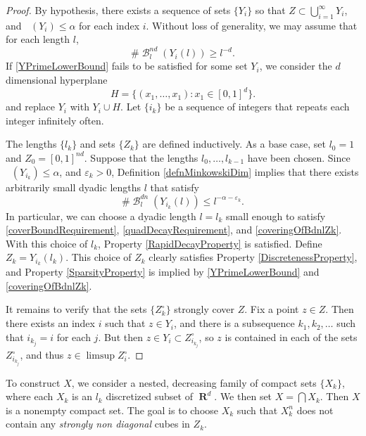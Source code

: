 \documentclass[dvipsnames,letterpaper,12pt]{article}
\numberwithin{equation}{section}
\theoremstyle{plain}
\theoremstyle{remark}
\DeclareMathOperator{\lowminkdim}{\underline{\dim}_{\mathbf{M}}}
\DeclareMathOperator{\RR}{\mathbf{R}}
\DeclareMathOperator{\setcolon}{\colon}
\DeclareMathOperator{\B}{\mathcal{B}}
\begin{document}
\begin{proof}
	By hypothesis, there exists a sequence of sets $\{Y_i\}$ so that $Z \subset \bigcup_{i = 1}^\infty Y_i$, and $\lowminkdim(Y_i) \leq \alpha$ for each index $i$. Without loss of generality, we may assume that for each length $l$,
	\begin{equation}\label{YPrimeLowerBound}
		\# \B^{nd}_l(Y_i(l)) \geq l^{-d}.
	\end{equation}
	If \eqref{YPrimeLowerBound} fails to be satisfied for some set $Y_i$, we consider the $d$ dimensional hyperplane
	\[ H = \{ (x_1,\dots, x_1) \setcolon x_1 \in [0,1]^d \}. \]
	and replace $Y_i$ with $Y_i \cup H$. Let $\{ i_k \}$ be a sequence of integers that repeats each integer infinitely often.

	The lengths $\{ l_k \}$ and sets $\{ Z_k \}$ are defined inductively. As a base case, set $l_0 = 1$ and $Z_0 = [0,1]^{nd}$. Suppose that the lengths $l_0, \ldots, l_{k-1}$ have been chosen. Since $\lowminkdim(Y_{i_k}) \leq \alpha$, and $\varepsilon_k > 0$, Definition \ref{defnMinkowskiDim} implies that there exists arbitrarily small dyadic lengths $l$ that satisfy
	\begin{equation} \label{coveringOfBdnlZk}
		\# \B^{dn}_l(Y_{i_k}(l)) \leq l^{-\alpha - \varepsilon_k}.
	\end{equation}
	In particular, we can choose a dyadic length $l = l_k$ small enough to satisfy \eqref{coverBoundRequirement}, \eqref{quadDecayRequirement}, and \eqref{coveringOfBdnlZk}. With this choice of $l_k$, Property \ref{RapidDecayProperty} is satisfied. Define $Z_k = Y_{i_k}(l_k)$. This choice of $Z_k$ clearly satisfies Property \ref{DiscretenessProperty}, and Property \ref{SparsityProperty} is implied by \eqref{YPrimeLowerBound} and \eqref{coveringOfBdnlZk}.

	It remains to verify that the sets $\{ Z_k^\circ \}$ strongly cover $Z$. Fix a point $z \in Z$. Then there exists an index $i$ such that $z \in Y_i$, and there is a subsequence $k_1, k_2, \dots$ such that $i_{k_j} = i$ for each $j$. But then $z \in Y_i \subset Z_{i_{k_j}}^\circ$, so $z$ is contained in each of the sets $Z_{i_{k_j}}^\circ$, and thus $z \in \limsup Z_i^\circ$.
\end{proof}

To construct $X$, we consider a nested, decreasing family of compact sets $\{ X_k \}$, where each $X_k$ is an $l_k$ discretized subset of $\RR^d$. We then set $X = \bigcap X_k$. Then $X$ is a nonempty compact set. The goal is to choose $X_k$ such that $X_k^n$ does not contain any {\it strongly non diagonal} cubes in $Z_k$.
\end{document}
